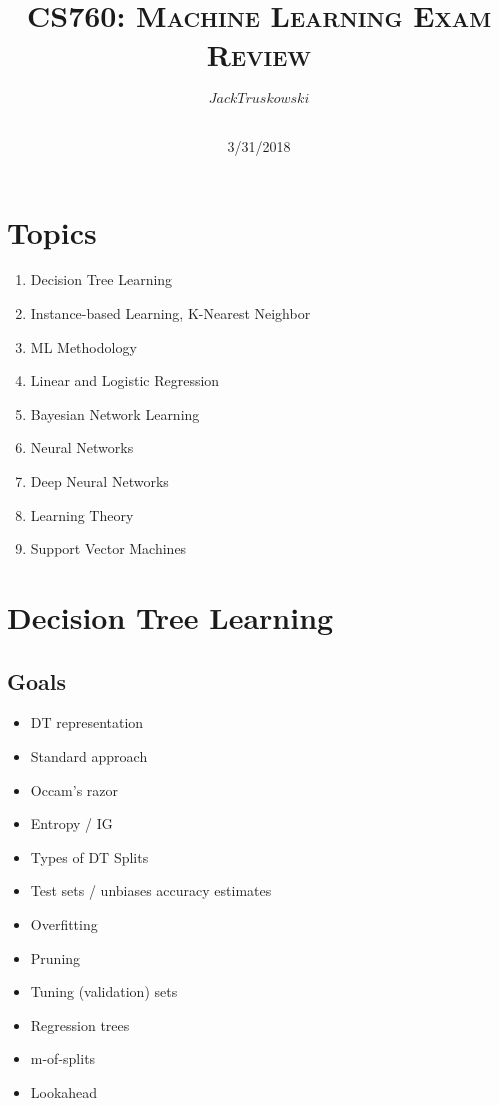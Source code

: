 \documentclass[a4paper]{article}
\title{\textsc{CS760: Machine Learning Exam Review}} %
\author{
$$Jack Truskowski$$ \\
}
\date{3/31/2018}
\begin{document}
\maketitle

\section{Topics}

\begin{enumerate}
\item Decision Tree Learning
\item Instance-based Learning, K-Nearest Neighbor
\item ML Methodology
\item Linear and Logistic Regression
\item Bayesian Network Learning
\item Neural Networks
\item Deep Neural Networks
\item Learning Theory
\item Support Vector Machines
\end{enumerate}

\section{Decision Tree Learning}
\subsection{Goals}
\begin{itemize}
\item DT representation
\item Standard approach
\item Occam's razor
\item Entropy / IG
\item Types of DT Splits
\item Test sets / unbiases accuracy estimates
\item Overfitting
\item Pruning
\item Tuning (validation) sets
\item Regression trees
\item m-of-splits
\item Lookahead
\end{itemize}
\end{document}

